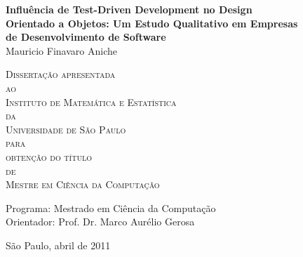 \documentclass[11pt,twoside,a4paper]{book}
\begin{document}
\frontmatter 
\fancyhead[RO]{{\footnotesize\rightmark}\hspace{2em}\thepage}
\setcounter{tocdepth}{2}
\fancyhead[LE]{\thepage\hspace{2em}\footnotesize{\leftmark}}
\fancyhead[RE,LO]{}
\fancyhead[RO]{{\footnotesize\rightmark}\hspace{2em}\thepage}

\onehalfspacing  %

\thispagestyle{empty}
\begin{center}
    \vspace*{2.3cm}
    \textbf{\Large{Influência de Test-Driven Development no Design \\Orientado a
    Objetos: Um Estudo Qualitativo em Empresas \\de Desenvolvimento de
    Software}}\\
    
    \vspace*{1.2cm}
    \Large{Mauricio Finavaro Aniche}
    
    \vskip 2cm
    \textsc{
    Dissertação apresentada\\[-0.25cm] 
    ao\\[-0.25cm]
    Instituto de Matemática e Estatística\\[-0.25cm]
    da\\[-0.25cm]
    Universidade de São Paulo\\[-0.25cm]
    para\\[-0.25cm]
    obtenção do título\\[-0.25cm]
    de\\[-0.25cm]
    Mestre em Ciência da Computação}
    
    \vskip 1.5cm
    Programa: Mestrado em Ciência da Computação\\
    Orientador: Prof. Dr. Marco Aurélio Gerosa

   	\vskip 1.5cm
    \normalsize{São Paulo, abril de 2011}
\end{center}

\end{document}
